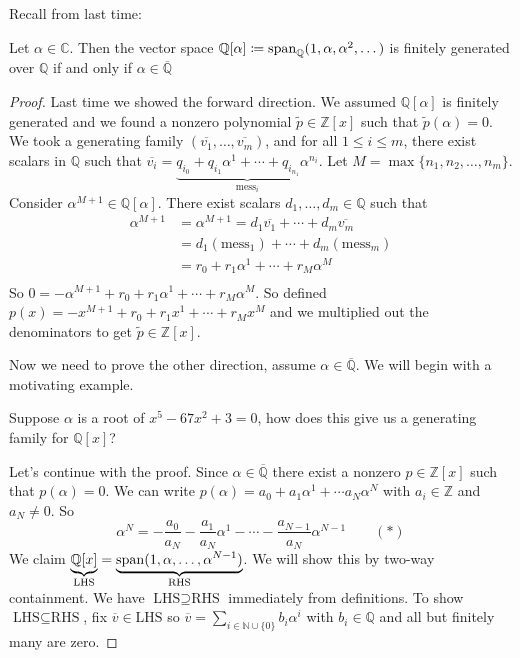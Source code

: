 Recall from last time:
\begin{lemma}
    Let \(\alpha \in \mathbb{C} \). Then the vector space \(\mathbb{Q} [\alpha ]\coloneqq \operatorname{span}_\mathbb{Q} (1, \alpha , \alpha ^2, \dots )\) is finitely generated over \(\mathbb{Q} \) if and only if \(\alpha \in \overline{\mathbb{Q} } \)   
\end{lemma}
\begin{proof}
    Last time we showed the forward direction. We assumed \(\mathbb{Q} [\alpha ]\) is finitely generated and we found a nonzero polynomial \(\widetilde{p} \in \mathbb{Z} [x]\) such that \(\widetilde{p}(\alpha ) = 0\). We took a generating family \((\overline{v_1}, \dots , \overline{v_m}  )\), and for all \(1 \leq i \leq m\), there exist scalars in \(\mathbb{Q} \) such that \(\overline{v_i} = \underbrace{q_{i_{0}} + q_{i_{1}} \alpha ^{1} + \cdots + q_{i_{n_{1}}} \alpha ^{n_{i}}}_{\text{mess}_i }\). Let \(M=\max\{ n_1, n_2, \dots , n_m \} \). Consider \(\alpha ^{M+1} \in \mathbb{Q} [\alpha ]\). There exist scalars \(d_1, \dots , d_m \in \mathbb{Q} \) such that
    \begin{align*}
        \alpha ^{M+1} &= \alpha ^{M+1} = d_1 \overline{v_1} + \cdots + d_m \overline{v_m} \\
        &= d_1 (\text{mess}_1 ) + \cdots + d_m (\text{mess}_m ) \\
        &= r_0 + r_1 \alpha ^1 + \cdots + r_M \alpha ^M  \\
    \end{align*} 
    So \(0 = -\alpha ^{M+1} + r_0 + r_1 \alpha ^1 + \cdots + r_M \alpha ^M\). So defined \(p(x) = -x ^{M+1} + r_0 + r_1 x ^1 + \cdots + r_M x ^M\) and we multiplied out the denominators to get \(\widetilde{p} \in \mathbb{Z} [x]\).
    
    Now we need to prove the other direction, assume \(\alpha  \in \overline{\mathbb{Q}} \). We will begin with a motivating example.
    \begin{eg}
        Suppose \(\alpha \) is a root of \(x^5 - 67x^2 +3 =0\), how does this give us a generating family for \(\mathbb{Q} [x]\)?   
    \end{eg} 
    Let's continue with the proof. Since \(\alpha  \in \overline{\mathbb{Q} } \) there exist a nonzero \(p \in \mathbb{Z} [x]\) such that \(p(\alpha )=0\). We can write \(p(\alpha ) = a_0 + a_1 \alpha ^1 + \cdots a_N \alpha ^N\) with \(a_i \in \mathbb{Z} \) and \(a_N \neq 0\). So
    \[
        \alpha ^N = - \frac{a_0}{a_N} - \frac{a_1}{a_N} \alpha ^1 - \cdots - \frac{a_{N-1} }{a_N} \alpha ^{N-1} \qquad (*)
    \]
    We claim \(\underbrace{\mathbb{Q} [x]}_{\text{LHS} } = \underbrace{\operatorname{span}(1,\alpha , \dots , \alpha ^{N-1})}_{\text{RHS} }\). We will show this by two-way containment. We have \(\text{LHS} \supseteq \text{RHS} \) immediately from definitions. To show \(\text{LHS} \subseteq  \text{RHS} \), fix \(\overline{v} \in \text{LHS} \) so \(\overline{v} = \sum_{i \in \mathbb{N} \cup \{ 0 \} } b_i \alpha ^i \) with \(b_i \in \mathbb{Q} \) and all but finitely many are zero. 
    

\end{proof}
